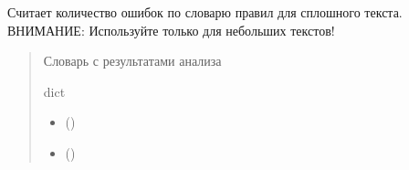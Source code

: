 \documentclass[a4paper,11pt,russian,openany,oneside]{sphinxmanual}
\begin{document}
\begin{savenotes}\begin{fulllineitems}
\label{\detokenize{_autosummary/processing_module.calculate_data:processing_module.calculate_data.make_text_processing}}
\pysigstartsignatures
\pysiglinewithargsret
{}
{\sphinxparamcomma {}}
{}
\pysigstopsignatures
\sphinxAtStartPar
Считает количество ошибок по словарю правил для сплошного текста.
ВНИМАНИЕ: Используйте только для небольших текстов!
\begin{quote}\begin{description}
\sphinxAtStartPar
Словарь с результатами анализа

\sphinxAtStartPar
dict

\begin{itemize}
\item {} 
\sphinxAtStartPar
{} ()

\item {} 
\sphinxAtStartPar
{} ()

\end{itemize}

\end{description}\end{quote}

\end{fulllineitems}\end{savenotes}

\end{document}
